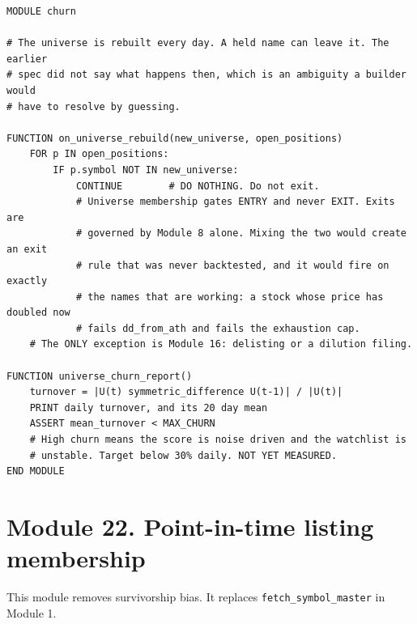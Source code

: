 \documentclass[10pt]{article}
\begin{document}
\begin{lstlisting}
MODULE churn

# The universe is rebuilt every day. A held name can leave it. The earlier
# spec did not say what happens then, which is an ambiguity a builder would
# have to resolve by guessing.

FUNCTION on_universe_rebuild(new_universe, open_positions)
    FOR p IN open_positions:
        IF p.symbol NOT IN new_universe:
            CONTINUE        # DO NOTHING. Do not exit.
            # Universe membership gates ENTRY and never EXIT. Exits are
            # governed by Module 8 alone. Mixing the two would create an exit
            # rule that was never backtested, and it would fire on exactly
            # the names that are working: a stock whose price has doubled now
            # fails dd_from_ath and fails the exhaustion cap.
    # The ONLY exception is Module 16: delisting or a dilution filing.

FUNCTION universe_churn_report()
    turnover = |U(t) symmetric_difference U(t-1)| / |U(t)|
    PRINT daily turnover, and its 20 day mean
    ASSERT mean_turnover < MAX_CHURN
    # High churn means the score is noise driven and the watchlist is
    # unstable. Target below 30% daily. NOT YET MEASURED.
END MODULE
\end{lstlisting}

\section{Module 22. Point-in-time listing membership}

This module removes survivorship bias. It replaces \texttt{fetch\_symbol\_master} in Module 1.
\end{document}

